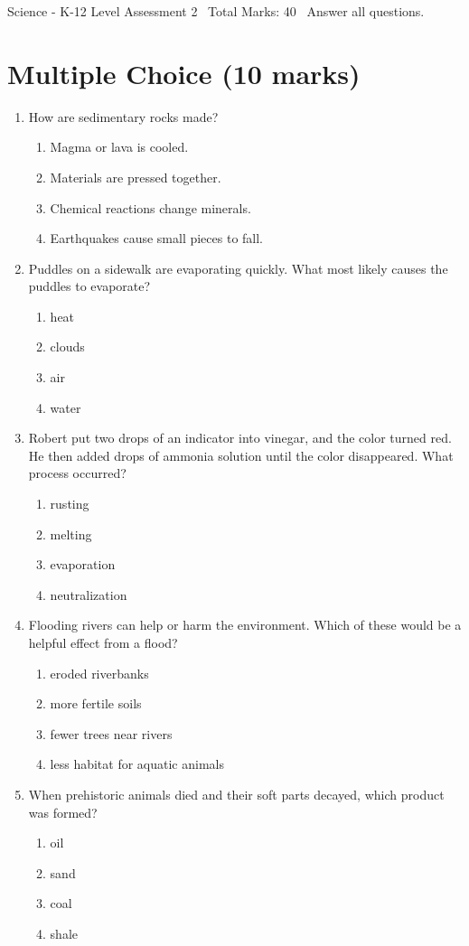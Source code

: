 \documentclass[12pt]{article}
\begin{document}
\begin{center}
Science - K-12 Level Assessment 2 \
Total Marks: 40 \
Answer all questions.
\end{center}

\section*{Multiple Choice (10 marks)}
\begin{enumerate}[label=\arabic*.]
\item How are sedimentary rocks made?
\begin{enumerate}[label=(\alph*)]
    \item Magma or lava is cooled.
    \item Materials are pressed together.
    \item Chemical reactions change minerals.
    \item Earthquakes cause small pieces to fall.
\end{enumerate}
\item Puddles on a sidewalk are evaporating quickly. What most likely causes the puddles to
evaporate?
\begin{enumerate}[label=(\alph*)]
    \item heat
    \item clouds
    \item air
    \item water
\end{enumerate}
\item Robert put two drops of an indicator into vinegar, and the color turned red. He then added
drops of ammonia solution until the color disappeared. What process occurred?
\begin{enumerate}[label=(\alph*)]
    \item rusting
    \item melting
    \item evaporation
    \item neutralization
\end{enumerate}
\item Flooding rivers can help or harm the environment. Which of these would be a helpful effect
from a flood?
\begin{enumerate}[label=(\alph*)]
    \item eroded riverbanks
    \item more fertile soils
    \item fewer trees near rivers
    \item less habitat for aquatic animals
\end{enumerate}
\item When prehistoric animals died and their soft parts decayed, which product was formed?
\begin{enumerate}[label=(\alph*)]
    \item oil
    \item sand
    \item coal
    \item shale
\end{enumerate}
\end{enumerate}
\end{document}
